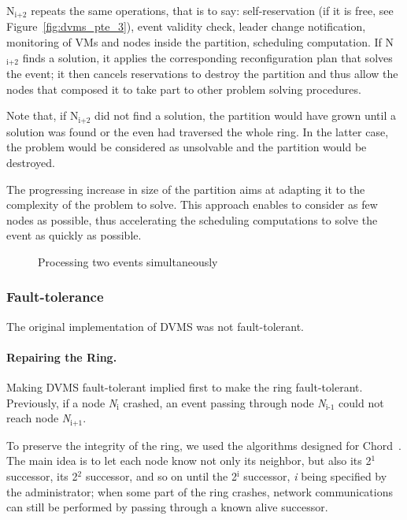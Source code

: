 N\(_{\text{i+2}}\) repeats the same operations, that is to say: self-reservation
(if it is free, see Figure~\ref{fig:dvms_pte_3}), event validity check, leader
change notification, monitoring of VMs and nodes inside the partition,
scheduling computation.  If N\(_{\text{i+2}}\) finds a solution, it applies the
corresponding reconfiguration plan that solves the event; it then cancels
reservations to destroy the partition and thus allow the nodes that composed it
to take part to other problem solving procedures.

Note that, if N\(_{\text{i+2}}\) did not find a solution, the partition would
have grown until a solution was found or the even had traversed the whole ring.
In the latter case, the problem would be considered as unsolvable and the
partition would be destroyed.

The progressing increase in size of the partition aims at adapting it to the
complexity of the problem to solve.
This approach enables to consider as few nodes as possible, thus accelerating
the scheduling computations to solve the event as quickly as possible.

\begin{figure}[h]
%
%
%
%
\caption{Processing two events simultaneously\label{fig:dvms_pte}}
\end{figure}


\subsubsection{Fault-tolerance}

The original implementation of DVMS was not fault-tolerant.


\paragraph{Repairing the Ring.}

Making DVMS fault-tolerant implied first to make the ring fault-tolerant.
Previously, if a node \emph{N\(_{\text{i}}\)} crashed, an event passing through
node \emph{N\(_{\text{i-1}}\)} could not reach node \emph{N\(_{\text{i+1}}\)}.

To preserve the integrity of the ring, we used the algorithms
designed for Chord~\cite{stoica:ton03}.
%
The main idea is to let each node know not only its neighbor, but also its
2\(^{\text{1}}\) successor, its 2\(^{\text{2}}\) successor, and so on until the
2\(^{\text{i}}\) successor, \emph{i} being specified by the administrator;
%
when some part of the ring crashes, network communications can still be
performed by passing through a known alive successor.


